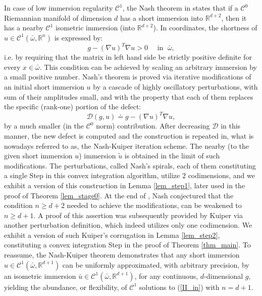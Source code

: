 \documentclass[reqno,twoside,11pt]{amsart}
\newcommand{\R}{\mathbb{R}}
\numberwithin{equation}{section}
\theoremstyle{plain}
\theoremstyle{definition}
\begin{document}
\medskip

In case of low immersion regularity
$\mathcal{C}^1$, the Nash theorem in \cite{Nash2} states that 
if a $\mathcal{C}^0$ Riemannian manifold of dimension $d$ has a short immersion into
$\R^{d+2}$, then it has a nearby $\mathcal{C}^1$ isometric immersion (into $\R^{d+2}$). In
coordinates, the shortness of $u\in\mathcal{C}^1(\bar
\omega, \R^n)$ is expressed by:
$$g - (\nabla u)^T \nabla u > 0 \quad \text{ in } \; \bar \omega,$$ 
i.e. by requiring that the matrix in left hand side be strictly positive definite for
every $x\in\bar \omega$. This condition can be achieved by scaling an
arbitrary immersion by  a small positive
number. Nash's theorem is proved via iterative modifications of an initial short immersion
$u$ by a cascade of highly oscillatory perturbations, with sum of
their amplitudes small, and with the property that each of them
replaces the specific (rank-one) portion of 
the defect:
\begin{equation}\label{def_def}
\mathcal{D}(g,u)\doteq g - (\nabla u)^T \nabla u, 
\end{equation}
by a much smaller (in the $\mathcal{C}^0$ norm) contribution. After
decreasing $\mathcal D$ in this manner, the new defect is
computed and the construction is repeated in, what is nowadays
referred to as, the Nash-Kuiper iteration scheme.
The nearby (to the given short immersion $u$) immersion $\tilde u$ is
obtained in the limit of such modifications.
The perturbations, called Nash's spirals, each of them
constituting a single Step in this convex integration algorithm,
utilize $2$ codimensions, and we exhibit a version of this
construction in Lemma \ref{lem_step1}, later used in the proof of
Theorem \ref{lem_stage0}. At the end of \cite{Nash2}, Nash conjectured
that the condition $n\geq d+2$ needed to achieve the modifications, can be weakened
to $n\geq d+1$. A  proof of this assertion was subsequently provided by Kuiper \cite{Kuiper}
via another perturbation definition, which indeed utilizes only one
codimension. We exhibit a version of such Kuiper's
corrugation  in Lemma \ref{lem_step2}, constituting a convex integration Step
in the proof of Theorem \ref{thm_main}. To reassume, the
Nash-Kuiper theorem demonstrates that any short immersion
$u\in\mathcal{C}^{1}(\bar\omega, \R^{d+1})$ can be uniformly
approximated, with arbitrary precision, 
by an isometric immersion $\bar u\in \mathcal{C}^{1}(\bar\omega, \R^{d+1})$, for
any continuous, $d$-dimensional $g$, yielding the 
abundance, or flexibility, of $\mathcal{C}^1$ solutions to (\ref{II_in}) with $n=d+1$.
\end{document}
